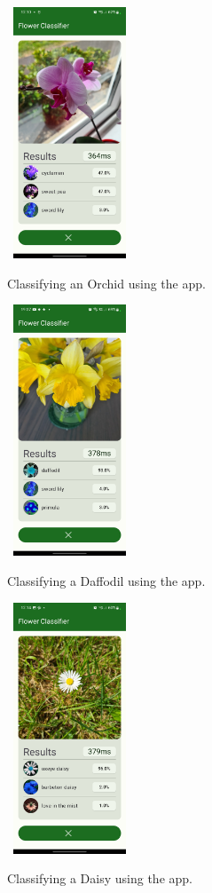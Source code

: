 \documentclass[12pt,a4paper]{report}
\begin{document}
\begin{figure}[h]\
    \includegraphics[width=0.3\textwidth]{cyclamen.jpg}
    \caption{Classifying an Orchid using the app.}
    \label{fig:cyclamen}
\end{figure}

\begin{figure}[h]\
    \includegraphics[width=0.3\textwidth]{daffodil.jpg}
    \caption{Classifying a Daffodil using the app.}
    \label{fig:daffodil}
\end{figure}

\begin{figure}[h]\
    \includegraphics[width=0.3\textwidth]{daisy.jpg}
    \caption{Classifying a Daisy using the app.}
    \label{fig:daisy}
\end{figure}
\end{document}
